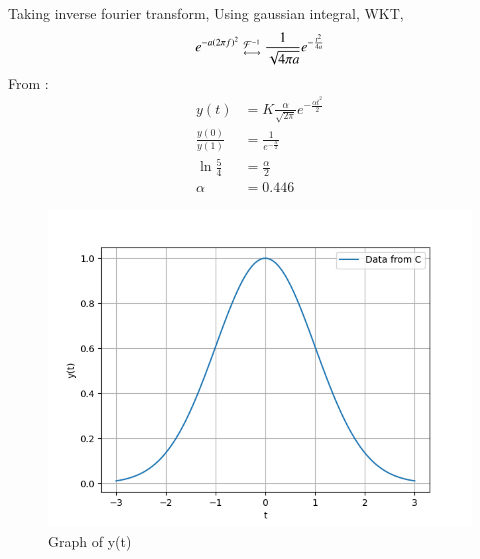 \documentclass[journal,12pt,twocolumn]{IEEEtran}
\theoremstyle{remark}
\begin{document}
Taking inverse fourier transform, Using gaussian integral,
WKT, 
\begin{align}
     e^{-a\left(2\pi f\right)^2} \mathrel{\substack{\mathcal{F}^{-1}\\\longleftrightarrow}} \frac{1}{\sqrt{4\pi a}} e^{-\frac{t^2}{4a}}
\end{align}
From :
\begin{align}
    y(t) &= K \frac{\alpha}{\sqrt{2\pi}} e^{-\frac{\alpha t^2}{2}}\\
    \frac{y(0)}{y(1)} &= \frac{1}{e^{-\frac{\alpha}{2}}}\\
    \ln\frac{5}{4} &= \frac{\alpha}{2} \\
    \alpha &= 0.446 
\end{align}

\begin{figure}[!h] 
    \centering
    \includegraphics[width=\columnwidth]{figs/graph_of_y(t).png}
    \caption{Graph of y(t)}
    \label{fig:Graph1_gate_CE_30}
    \end{figure}
\end{document}
